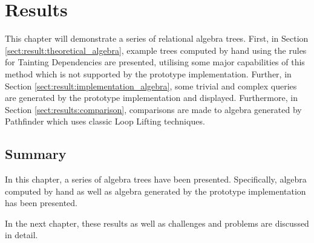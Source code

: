 \chapter{Results}
\label{chapter:results}
This chapter will demonstrate a series of relational algebra trees. First, in
Section \ref{sect:result:theoretical_algebra}, example trees computed by hand
using the rules for Tainting Dependencies are presented, utilising
some major capabilities of this method which is not supported by the prototype
implementation. Further, in Section \ref{sect:result:implementation_algebra},
some trivial and complex queries are generated by the prototype implementation
and displayed. Furthermore, in Section \ref{sect:results:comparison},
comparisons are made to algebra generated by Pathfinder which uses classic
Loop Lifting techniques.




\section{Summary}
\label{sect:res:summary}
In this chapter, a series of algebra trees have been presented. Specifically,
algebra computed by hand as well as algebra generated by the prototype
implementation has been presented. 

In the next chapter, these results as well as challenges and problems are
discussed in detail.
